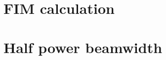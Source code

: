 \documentclass[journal]{IEEEtran}
\begin{document}
%
\appendices
\section{FIM calculation}
\label{apdx_clacFim}

\section{Half power beamwidth}
\label{apdx_HPBW}

% 

\ifCLASSOPTIONcaptionsoff
  \newpage
\fi






% 
%
\end{document}
